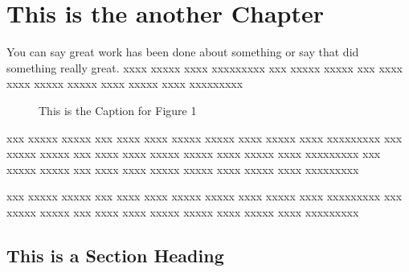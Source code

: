  
\chapter{This is the another Chapter}
 
You can say great work has been done about something \citep{Castleman98,Granlund95} or say that \citet{Holmes95} did something really great.
xxxx xxxxx xxxx xxxxxxxxx 
xxx xxxxx xxxxx xxx xxxx xxxx xxxxx xxxxx xxxx xxxxx xxxx xxxxxxxxx
 
\begin{figure}
\vspace{2.0in}
\caption{This is the Caption for Figure 1}
\end{figure}
 
xxx xxxxx xxxxx xxx xxxx xxxx xxxxx xxxxx xxxx xxxxx xxxx xxxxxxxxx
xxx xxxxx xxxxx xxx xxxx xxxx xxxxx xxxxx xxxx xxxxx xxxx xxxxxxxxx
xxx xxxxx xxxxx xxx xxxx xxxx xxxxx xxxxx xxxx xxxxx xxxx xxxxxxxxx

xxx xxxxx xxxxx xxx xxxx xxxx xxxxx xxxxx xxxx xxxxx xxxx xxxxxxxxx
xxx xxxxx xxxxx xxx xxxx xxxx xxxxx xxxxx xxxx xxxxx xxxx xxxxxxxxx
 
\section{This is a Section Heading}
 